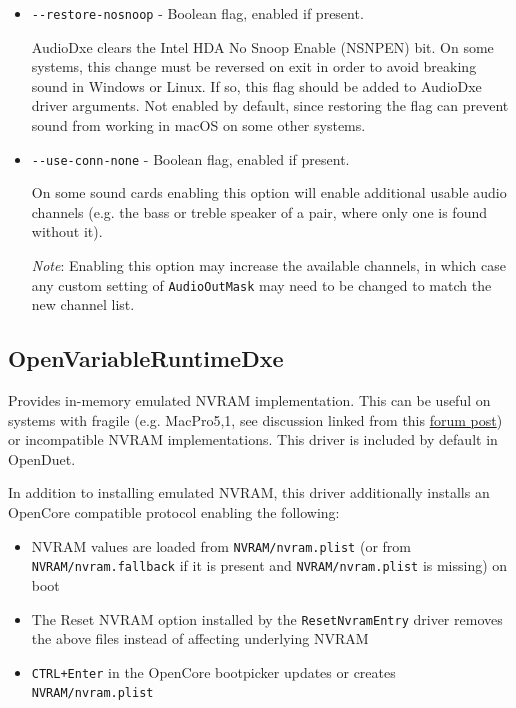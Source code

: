 \documentclass[]{article}
\providecommand{\tightlist}{%
  \setlength{\itemsep}{0pt}\setlength{\parskip}{0pt}}
\begin{document}
\begin{itemize}
  \texttt{HDA: GPIO setup on pins 0x0F - Success} \medskip

  Values for driver parameters can be specified in hexadecimal beginning with \texttt{0x} or
  in decimal, e.g. \texttt{-{}-gpio-pins=0x12} or \texttt{-{}-gpio-pins=18}. \medskip

  \item \texttt{-{}-restore-nosnoop} - Boolean flag, enabled if present. \medskip

  AudioDxe clears the Intel HDA No Snoop Enable (NSNPEN) bit. On some systems, this change must
  be reversed on exit in order to avoid breaking sound in Windows or Linux. If so, this flag should
  be added to AudioDxe driver arguments.
  Not enabled by default, since restoring the flag can prevent sound from working in macOS on
  some other systems. \medskip

  \item \texttt{-{}-use-conn-none} - Boolean flag, enabled if present. \medskip

  On some sound cards enabling this option will enable additional usable audio channels (e.g.
  the bass or treble speaker of a pair, where only one is found without it).
  \medskip

  \emph{Note}: Enabling this option may increase the available channels, in which case any
  custom setting of \texttt{AudioOutMask} may need to be changed to match the new channel list.
  \medskip
\end{itemize}

\subsection{OpenVariableRuntimeDxe}\label{emunvram}

Provides in-memory emulated NVRAM implementation. This can be useful on systems with fragile
(e.g. MacPro5,1, see discussion linked from this \href{https://forums.macrumors.com/posts/30945127}{forum post})
or incompatible NVRAM implementations. This driver is included by default in OpenDuet.

In addition to installing emulated NVRAM, this driver additionally installs an OpenCore compatible
protocol enabling the following:

\begin{itemize}
\tightlist
  \item NVRAM values are loaded from \texttt{NVRAM/nvram.plist} (or from \texttt{NVRAM/nvram.fallback}
  if it is present and \texttt{NVRAM/nvram.plist} is missing) on boot
  \item The Reset NVRAM option installed by the \texttt{ResetNvramEntry} driver removes the above files instead
  of affecting underlying NVRAM
  \item \texttt{CTRL+Enter} in the OpenCore bootpicker updates or creates \texttt{NVRAM/nvram.plist}
\end{itemize}
\end{document}

